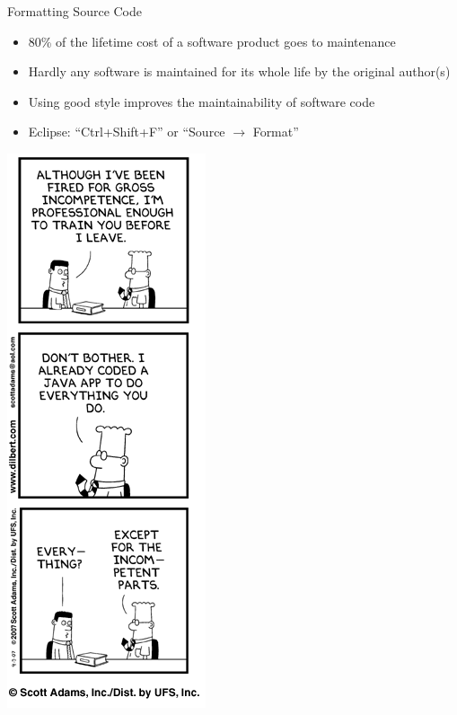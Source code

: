 \begin{frame}{Formatting Source Code}
  \begin{itemize}
  \item 80\% of the lifetime cost of a software product goes to
    maintenance
  \item Hardly any software is maintained for its whole life by the
    original author(s)
  \item Using good style improves the maintainability of software
    code
  \item Eclipse: ``Ctrl+Shift+F'' or ``Source $\rightarrow$ Format''
  \end{itemize}


  \begin{center}
    \includegraphics[scale=0.3]{figures/dilbert-1}
  \end{center}
\end{frame}

